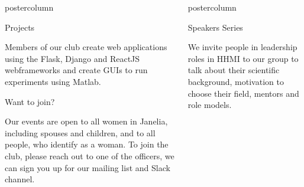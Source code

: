\documentclass{beamer}
\newlength{\columnheight}
\begin{document}
\begin{frame}
\begin{columns}
\begin{column}{.33\textwidth}
\begin{beamercolorbox}[center,wd=\textwidth]{postercolumn}
\begin{minipage}[T]{.95\textwidth}
{\begin{myblock}{Projects}
\begin{addmargin}[1em]{1em}
                            Members of our club create web applications using the Flask, Django and ReactJS webframeworks and create GUIs to run experiments using Matlab.
                        \end{addmargin}
                    \end{myblock}
                    \vspace{1.25cm}
                    \begin{myblock}{Want to join?}
                        \begin{addmargin}[1em]{1em}
                            Our events are open to all women in Janelia, including spouses and children, and to all people, who identify as a woman.\newline
                            To join the club, please reach out to one of the officers, we can sign you up for our mailing list and Slack channel.
                        \end{addmargin}
                    \end{myblock}}
		        \end{minipage}\end{beamercolorbox}
  \end{column}
	\begin{column}{.33\textwidth}
		\begin{beamercolorbox}[center,wd=\textwidth]{postercolumn}
			\begin{minipage}[T]{.95\textwidth}
				\parbox[t][\columnheight]{\textwidth}{
					\begin{myblock}{Speakers Series}
            \begin{addmargin}[1em]{1em}
                We invite people in leadership roles in HHMI to our group to talk about their scientific background, motivation to choose their field, mentors and role models.
                \vspace{1cm}
            \end{addmargin}
            \begin{addmargin}[1em]{1em}
                \centering
                \begin{minipage}{0.4\linewidth}

\end{minipage}
\end{addmargin}
\end{myblock}}
\end{minipage}
\end{beamercolorbox}
\end{column}
\end{columns}
\end{frame}
\end{document}
